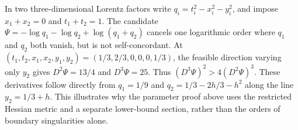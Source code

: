 \begin{example}
In two three-dimensional Lorentz factors write
$q_i=t_i^2-x_i^2-y_i^2$, and impose $x_1+x_2=0$ and
$t_1+t_2=1$. The candidate
$\Psi=-\log q_1-\log q_2+\log(q_1+q_2)$ cancels one logarithmic
order where $q_1$ and $q_2$ both vanish, but is not self-concordant. At
$(t_1,t_2,x_1,x_2,y_1,y_2)=(1/3,2/3,0,0,0,1/3)$, the feasible
direction varying only $y_2$ gives $D^2\Psi=13/4$ and
$D^3\Psi=25$. Thus $(D^3\Psi)^2>4(D^2\Psi)^3$.
These derivatives follow directly from
$q_1=1/9$ and $q_2=1/3-2h/3-h^2$ along the line $y_2=1/3+h$.
This illustrates why the parameter proof above uses the restricted
Hessian metric and a separate lower-bound section, rather than the
orders of boundary singularities alone.
\end{example}
